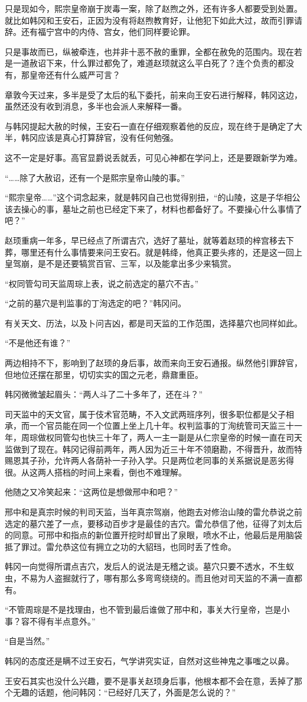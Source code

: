 只是现如今，熙宗皇帝崩于炭毒一案，除了赵煦之外，还有许多人都要受到处置。就比如韩冈和王安石，正因为没有将赵煦教育好，让他犯下如此大过，故而引罪请辞。还有福宁宫中的内侍、宫女，他们同样要论罪。

只是事故而已，纵被牵连，也并非十恶不赦的重罪，全都在赦免的范围内。现在若是一道赦诏下来，什么罪过都免了，难道赵顼就这么平白死了？连个负责的都没有，那皇帝还有什么威严可言？

章敦今天过来，多半是受了太后的私下委托，前来向王安石进行解释，韩冈这边，虽然还没有收到消息，多半也会派人来解释一番。

与韩冈提起大赦的时候，王安石一直在仔细观察着他的反应，现在终于是确定了大半，韩冈应该是真心打算辞官，没有任何勉强。

这不一定是好事。高官显爵说丢就丢，可见心神都在学问上，还是要跟新学为难。

“……除了大赦诏，还有一个是熙宗皇帝山陵的事。”

“熙宗皇帝……”这个词念起来，就是韩冈自己也觉得别扭，“的山陵，这是子华相公该去操心的事，墓址之前也已经定下来了，材料也都备好了。不要操心什么事情了吧？”

赵顼重病一年多，早已经点了所谓吉穴，选好了墓址，就等着赵顼的梓宫移去下葬，哪里还有什么事情要来问王安石。就是韩绛，他真正要头疼的，还是这一回上皇驾崩，是不是还要犒赏百官、三军，以及能拿出多少来犒赏。

“权同管勾司天监周琮上表，说之前选定的墓穴不吉。”

“之前的墓穴是判监事的丁洵选定的吧？”韩冈问。

有关天文、历法，以及卜问吉凶，都是司天监的工作范围，选择墓穴也同样如此。

“不是他还有谁？”

两边相持不下，影响到了赵顼的身后事，故而来向王安石通报。纵然他引罪辞官，但地位还摆在那里，切切实实的国之元老，鼎鼐重臣。

韩冈微微皱起眉头：“两人斗了二十多年了，还在斗？”

司天监中的天文官，属于伎术官范畴，不入文武两班序列，很多职位都是父子相承，而一个官员能在同一个位置上坐上几十年。权判监事的丁洵统管司天监三十一年，周琮做权同管勾也快三十年了，两人一主一副是从仁宗皇帝的时候一直在司天监做到了现在。韩冈记得前两年，两人因为近三十年不领磨勘，不得晋升，故而特赐恩其子孙，允许两人各荫补一子孙入学。只是两位老同事的关系据说是恶劣得很。从这两人搭档的时间上来看，倒也不难理解。

他随之又冷笑起来：“这两位是想做邢中和吧？”

邢中和是真宗时候的判司天监，当年真宗驾崩，他跑去对修治山陵的雷允恭说之前选定的墓穴差了一点，要移动百步才是最佳的吉穴。雷允恭信了他，征得了刘太后的同意。可邢中和指点的新位置开挖时却冒出了泉眼，喷水不止，他最后是用脑袋抵了罪过。雷允恭这位有拥立之功的大貂珰，也同时丢了性命。

韩冈一向觉得所谓点吉穴，发后人的说法是无稽之谈。墓穴只要不透水，不生蚁虫，不易为人盗掘就行了，哪有那么多弯弯绕绕的。而且他对司天监的不满一直都有。

“不管周琮是不是找理由，也不管到最后谁做了邢中和，事关大行皇帝，岂是小事？容不得有半点意外。”

“自是当然。”

韩冈的态度还是瞒不过王安石，气学讲究实证，自然对这些神鬼之事嗤之以鼻。

王安石其实也没什么兴趣，要不是事关赵顼身后事，他根本都不会在意，丢掉了那个无趣的话题，他问韩冈：“已经好几天了，外面是怎么说的？”


